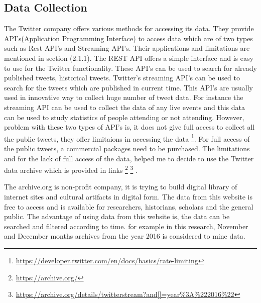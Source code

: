 \subsection{Data Collection}
The Twitter company offers various methods for accessing its data. They provide API's(Application Programming Interface) to access data which are of two types such as Rest API's and Streaming API's. Their applications and limitations are mentioned in section (2.1.1). The REST API offers a simple interface and is easy to use for the Twitter functionality. These API's can be used to search for already published tweets, historical tweets. Twitter's streaming API's can be used to search for the tweets which are published in current time. This API's are usually used in innovative way to collect huge number of tweet data. For instance the streaming API can be used to collect the data of any live events and this data can be used to study statistics of people attending or not attending. However, problem with these two types of API's is, it does not give full access to collect all the public tweets, they offer limitaions in accessing the data \footnote{\url{https://developer.twitter.com/en/docs/basics/rate-limiting}}. For full access of the public tweets, a commercial packages need to be purchased. The limitations and for the lack of full access of the data, helped me to decide to use the Twitter data archive which is provided in links \footnote{\url{https://archive.org/}} \footnote{\url{https://archive.org/details/twitterstream?and[]=year\%3A\%222016\%22}} \cite{Twitterarchive}. 

The archive.org is non-profit company, it is trying to build digital library of internet sites and cultural artifacts in digital form. The data from this website is free to access and is available for researchers, historians, scholars and the general public. The advantage of using data from this website is, the data can be searched and filtered according to time. for example in this research, November and December months archives from the year 2016 is considered to mine data. 

